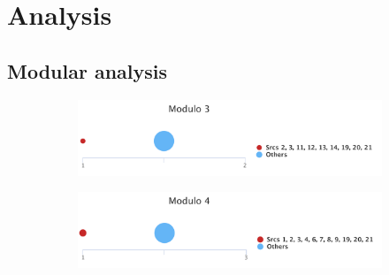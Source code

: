 \chapter{Analysis}
\label{appendix-analysis}

\section{Modular analysis}
\label{appendix-modular-analysis}

\begin{figure}[H]
\begin{subfigure}{0.45\textwidth}
	\includegraphics[width=\linewidth]{tex/images/analysis/mod3}
\end{subfigure}
\hfill
\begin{subfigure}{0.45\textwidth}
	\includegraphics[width=\linewidth]{tex/images/analysis/mod4}
\end{subfigure}\\


\end{figure}
